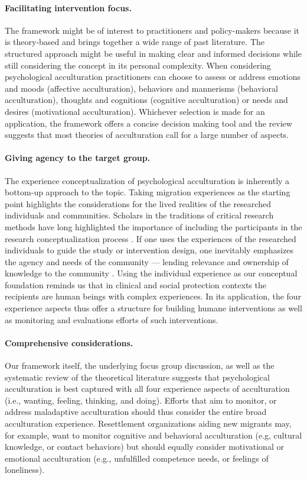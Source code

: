 \documentclass[man, 12pt, a4paper, mask]{apa7}
\begin{document}
\paragraph{Facilitating intervention focus.} The framework might be of interest to practitioners and policy-makers because it is theory-based and brings together a wide range of past literature. The structured approach might be useful in making clear and informed decisions while still considering the concept in its personal complexity. When considering psychological acculturation practitioners can choose to assess or address emotions and moods (affective acculturation), behaviors and mannerisms (behavioral acculturation), thoughts and cognitions (cognitive acculturation) or needs and desires (motivational acculturation). Whichever selection is made for an application, the framework offers a concise decision making tool and the review suggests that most theories of acculturation call for a large number of aspects.

\paragraph{Giving agency to the target group.} The experience conceptualization of psychological acculturation is inherently a bottom-up approach to the topic. Taking migration experiences as the starting point highlights the considerations for the lived realities of the researched individuals and communities. Scholars in the traditions of critical research methods have long highlighted the importance of including the participants in the research conceptualization process \citep[e.g.,][]{Kovach2009}. If one uses the experiences of the researched individuals to guide the study or intervention design, one inevitably emphasizes the agency and needs of the community --- lending relevance and ownership of knowledge to the community \citep[e.g., ][]{Schmidt2021}. Using the individual experience as our conceptual foundation reminds us that in clinical and social protection contexts the recipients are human beings with complex experiences. In its application, the four experience aspects thus offer a structure for building humane interventions as well as monitoring and evaluations efforts of such interventions. 

\paragraph{Comprehensive considerations.} Our framework itself, the underlying focus group discussion, as well as the systematic review of the theoretical literature suggests that psychological acculturation is best captured with all four experience aspects of acculturation (i.e., wanting, feeling, thinking, and doing). Efforts that aim to monitor, or address maladaptive acculturation should thus consider the entire broad acculturation experience. Resettlement organizations aiding new migrants may, for example, want to monitor cognitive and behavioral acculturation (e.g, cultural knowledge, or contact behaviors) but should equally consider motivational or emotional acculturation (e.g., unfulfilled competence needs, or feelings of loneliness). 
\end{document}

